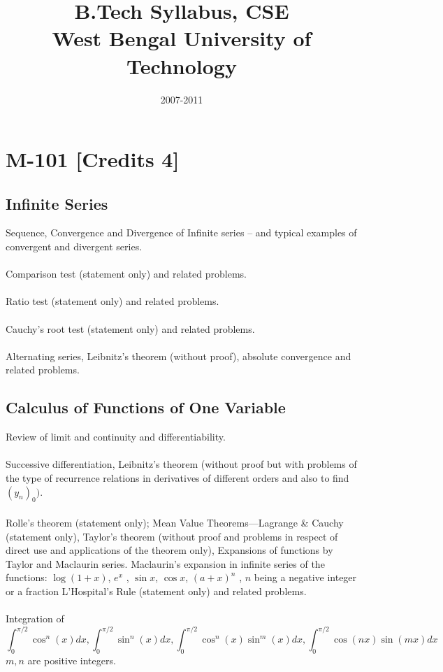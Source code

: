 \documentclass[12pt]{article}
\title{B.Tech Syllabus, CSE\\
West Bengal University of Technology}
\date{2007-2011}
\begin{document}
\begin{titlepage}
\maketitle
\end{titlepage}

\tableofcontents

\section{M-101 [Credits 4]}
\subsection{Infinite Series}
Sequence, Convergence and Divergence of Infinite series – and typical examples of convergent and divergent series.\\ \\ 
Comparison test (statement only) and related problems.\\ \\
Ratio test (statement only) and related problems.\\ \\
Cauchy’s root test (statement only) and related problems.\\ \\
Alternating series, Leibnitz’s theorem (without proof), absolute convergence and related problems.
\subsection{Calculus of Functions of One Variable}
Review of limit and continuity and differentiability. \\ \\
Successive  differentiation,  Leibnitz’s  theorem  (without  proof  but  with  problems  of  the  type  of recurrence relations in derivatives of different orders and also to find $(y_n)_0)$.\\ \\
Rolle’s theorem (statement only); Mean Value Theorems—Lagrange \& Cauchy (statement only), Taylor’s  theorem  (without  proof  and  problems  in  respect  of  direct  use  and  applications  of  the theorem only), Expansions of functions by Taylor and Maclaurin series. Maclaurin’s expansion in infinite series of the functions: $\log (1+x)$, $e^x$ , $\sin x$, $\cos x$, $(a+x)^n$ , $n$ being a negative integer or a fraction L’Hospital’s Rule (statement only) and related problems.\\ \\
Integration of
\[
\int_0^{\pi/2}\cos^n(x)dx,\int_0^{\pi/2}\sin^n(x)dx,\int_0^{\pi/2}\cos^n(x)\sin^m(x)dx,\int_0^{\pi/2}\cos(nx)\sin(mx)dx
\]
$m,n$ are positive integers.
\end{document}
